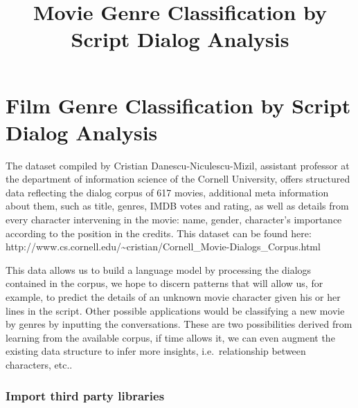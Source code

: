 \documentclass[11pt]{article}
\title{Movie Genre Classification by Script Dialog Analysis}
\begin{document}
    
    
    \maketitle
    
    

    
    \hypertarget{film-genre-classification-by-script-dialog-analysis}{%
\section{Film Genre Classification by Script Dialog
Analysis}\label{film-genre-classification-by-script-dialog-analysis}}

    The dataset compiled by Cristian Danescu-Niculescu-Mizil, assistant
professor at the department of information science of the Cornell
University, offers structured data reflecting the dialog corpus of 617
movies, additional meta information about them, such as title, genres,
IMDB votes and rating, as well as details from every character
intervening in the movie: name, gender, character's importance according
to the position in the credits. This dataset can be found here:
http://www.cs.cornell.edu/\textasciitilde{}cristian/Cornell\_Movie-Dialogs\_Corpus.html

This data allows us to build a language model by processing the dialogs
contained in the corpus, we hope to discern patterns that will allow us,
for example, to predict the details of an unknown movie character given
his or her lines in the script. Other possible applications would be
classifying a new movie by genres by inputting the conversations. These
are two possibilities derived from learning from the available corpus,
if time allows it, we can even augment the existing data structure to
infer more insights, i.e.~relationship between characters, etc..

    \hypertarget{import-third-party-libraries}{%
\subsubsection{Import third party
libraries}\label{import-third-party-libraries}}
\end{document}
